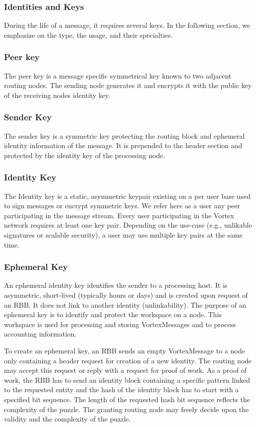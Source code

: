 \documentclass[10pt,journal,compsoc]{IEEEtran}
\begin{document}
\subsubsection{Identities and Keys}
During the life of a message, it requires several keys. In the following section, we emphasize on the type, the usage, and their specialties.

\subsubsection{Peer key}
The peer key is a message specific symmetrical key known to two adjacent routing nodes. The sending node generates it and encrypts it with the public key of the receiving nodes identity key.

\subsubsection{Sender Key}
The sender key is a symmetric key protecting the routing block and ephemeral identity information of the message. It is prepended to the header section and protected by the identity key of the processing node.

\subsubsection{Identity Key}
The Identity key is a static, asymmetric keypair existing on a per user base used to sign messages or encrypt symmetric keys. We refer here as a user any peer participating in the message stream. Every user participating in the Vortex network requires at least one key pair. Depending on the use-case (e.g., unlikable signatures or scalable security), a user may use multiple key pairs at the same time.

\subsubsection{Ephemeral Key}
An ephemeral identity key identifies the sender to a processing host. It is asymmetric, short-lived (typically hours or days) and is created upon request of an RBB. It does not link to another identity (unlinkability). The purpose of an ephemeral key is to identify and protect the workspace on a node. This workspace is used for processing and storing VortexMessages and to process accounting information.  

To create an ephemeral key, an RBB sends an empty VortexMessage to a node only containing a header request for creation of a new identity. The routing node may accept this request or reply with a request for proof of work. As a proof of work, the RBB has to send an identity block containing a specific pattern linked to the requested entity and the hash of the identity block has to start with a specified bit sequence. The length of the requested hash bit sequence reflects the complexity of the puzzle. The granting routing node may freely decide upon the validity and the complexity of the puzzle. 
\end{document}
